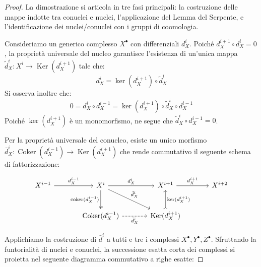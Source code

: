 \begin{proof}
La dimostrazione si articola in tre fasi principali: la costruzione delle mappe indotte tra conuclei e nuclei, l'applicazione del Lemma del Serpente, e l'identificazione dei nuclei/conuclei con i gruppi di coomologia.

Consideriamo un generico complesso $X^\bullet$ con differenziali $d_X^i$. Poiché
$d_X^{i+1} \circ d_X^i = 0$, la proprietà universale del nucleo garantisce
l'esistenza di un'unica mappa $\tilde{d}_X^i: X^i \to
\operatorname{Ker}(d_X^{i+1})$ tale che:
\[
d_X^i = \operatorname{ker}(d_X^{i+1}) \circ \tilde{d}_X^i
\]
Si osserva inoltre che:
\[
0 = d_X^i \circ d_X^{i-1} = \operatorname{ker}(d_X^{i+1}) \circ \tilde{d}_X^i \circ d_X^{i-1}
\]
Poiché $\operatorname{ker}(d_X^{i+1})$ è un monomorfismo, ne segue che $\tilde{d}_X^i \circ d_X^{i-1} = 0$. 

Per la proprietà universale del conucleo, esiste un unico morfismo $\bar{d}_X^i: \operatorname{Coker}(d_X^{i-1}) \to \operatorname{Ker}(d_X^{i+1})$ che rende commutativo il seguente schema di fattorizzazione:

\[
\begin{tikzcd}[column sep=large, row sep=large]
X^{i-1} \arrow[r, "d_X^{i-1}"] & X^i \arrow[r, "d_X^i"] \arrow[d, "\operatorname{coker}(d_X^{i-1})"', two heads] \arrow[rd, "\tilde{d}_X^i"] & X^{i+1} \arrow[r, "d_X^{i+1}"] & X^{i+2} \\
& \operatorname{Coker}(d_X^{i-1}) \arrow[r, "\bar{d}_X^i"', dashed] &
\operatorname{Ker}(d_X^{i+1}) \arrow[u, "\operatorname{ker}(d_X^{i+1})"', tail] &
\end{tikzcd}
\]

Applichiamo la costruzione di $\bar{d}^i$ a tutti e tre i complessi $X^\bullet,
Y^\bullet, Z^\bullet$. Sfruttando la funtorialità di nuclei e conuclei, la
successione esatta corta dei complessi si proietta nel seguente diagramma
commutativo a righe esatte:


\end{proof}
